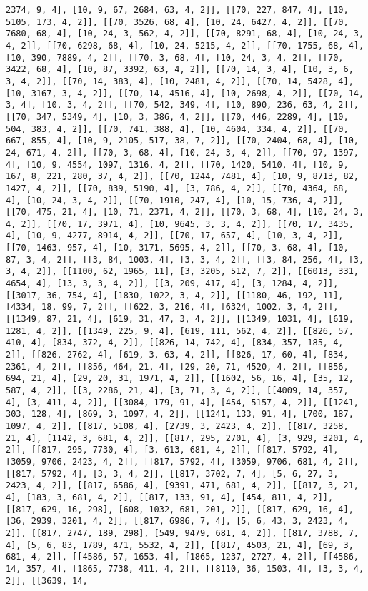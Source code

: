 \documentclass[12pt,fleqn]{article}\usepackage{../../common}
\begin{document}
\begin{verbatim}
2374, 9, 4], [10, 9, 67, 2684, 63, 4, 2]], [[70, 227, 847, 4], [10, 5105, 173, 4, 2]], [[70, 3526, 68, 4], [10, 24, 6427, 4, 2]], [[70, 7680, 68, 4], [10, 24, 3, 562, 4, 2]], [[70, 8291, 68, 4], [10, 24, 3, 4, 2]], [[70, 6298, 68, 4], [10, 24, 5215, 4, 2]], [[70, 1755, 68, 4], [10, 390, 7889, 4, 2]], [[70, 3, 68, 4], [10, 24, 3, 4, 2]], [[70, 3422, 68, 4], [10, 87, 3392, 63, 4, 2]], [[70, 14, 3, 4], [10, 3, 6, 3, 4, 2]], [[70, 14, 383, 4], [10, 2481, 4, 2]], [[70, 14, 5428, 4], [10, 3167, 3, 4, 2]], [[70, 14, 4516, 4], [10, 2698, 4, 2]], [[70, 14, 3, 4], [10, 3, 4, 2]], [[70, 542, 349, 4], [10, 890, 236, 63, 4, 2]], [[70, 347, 5349, 4], [10, 3, 386, 4, 2]], [[70, 446, 2289, 4], [10, 504, 383, 4, 2]], [[70, 741, 388, 4], [10, 4604, 334, 4, 2]], [[70, 667, 855, 4], [10, 9, 2105, 517, 38, 7, 2]], [[70, 2404, 68, 4], [10, 24, 671, 4, 2]], [[70, 3, 68, 4], [10, 24, 3, 4, 2]], [[70, 97, 1397, 4], [10, 9, 4554, 1097, 1316, 4, 2]], [[70, 1420, 5410, 4], [10, 9, 167, 8, 221, 280, 37, 4, 2]], [[70, 1244, 7481, 4], [10, 9, 8713, 82, 1427, 4, 2]], [[70, 839, 5190, 4], [3, 786, 4, 2]], [[70, 4364, 68, 4], [10, 24, 3, 4, 2]], [[70, 1910, 247, 4], [10, 15, 736, 4, 2]], [[70, 475, 21, 4], [10, 71, 2371, 4, 2]], [[70, 3, 68, 4], [10, 24, 3, 4, 2]], [[70, 17, 3971, 4], [10, 9645, 3, 3, 4, 2]], [[70, 17, 3435, 4], [10, 9, 4277, 8914, 4, 2]], [[70, 17, 657, 4], [10, 3, 4, 2]], [[70, 1463, 957, 4], [10, 3171, 5695, 4, 2]], [[70, 3, 68, 4], [10, 87, 3, 4, 2]], [[3, 84, 1003, 4], [3, 3, 4, 2]], [[3, 84, 256, 4], [3, 3, 4, 2]], [[1100, 62, 1965, 11], [3, 3205, 512, 7, 2]], [[6013, 331, 4654, 4], [13, 3, 3, 4, 2]], [[3, 209, 417, 4], [3, 1284, 4, 2]], [[3017, 36, 754, 4], [1830, 1022, 3, 4, 2]], [[1180, 46, 192, 11], [4334, 18, 99, 7, 2]], [[622, 3, 216, 4], [6324, 1002, 3, 4, 2]], [[1349, 87, 21, 4], [619, 31, 47, 3, 4, 2]], [[1349, 1031, 4], [619, 1281, 4, 2]], [[1349, 225, 9, 4], [619, 111, 562, 4, 2]], [[826, 57, 410, 4], [834, 372, 4, 2]], [[826, 14, 742, 4], [834, 357, 185, 4, 2]], [[826, 2762, 4], [619, 3, 63, 4, 2]], [[826, 17, 60, 4], [834, 2361, 4, 2]], [[856, 464, 21, 4], [29, 20, 71, 4520, 4, 2]], [[856, 694, 21, 4], [29, 20, 31, 1971, 4, 2]], [[1602, 56, 16, 4], [35, 12, 587, 4, 2]], [[3, 2286, 21, 4], [3, 71, 3, 4, 2]], [[4009, 14, 357, 4], [3, 411, 4, 2]], [[3084, 179, 91, 4], [454, 5157, 4, 2]], [[1241, 303, 128, 4], [869, 3, 1097, 4, 2]], [[1241, 133, 91, 4], [700, 187, 1097, 4, 2]], [[817, 5108, 4], [2739, 3, 2423, 4, 2]], [[817, 3258, 21, 4], [1142, 3, 681, 4, 2]], [[817, 295, 2701, 4], [3, 929, 3201, 4, 2]], [[817, 295, 7730, 4], [3, 613, 681, 4, 2]], [[817, 5792, 4], [3059, 9706, 2423, 4, 2]], [[817, 5792, 4], [3059, 9706, 681, 4, 2]], [[817, 5792, 4], [3, 3, 4, 2]], [[817, 3702, 7, 4], [5, 6, 27, 3, 2423, 4, 2]], [[817, 6586, 4], [9391, 471, 681, 4, 2]], [[817, 3, 21, 4], [183, 3, 681, 4, 2]], [[817, 133, 91, 4], [454, 811, 4, 2]], [[817, 629, 16, 298], [608, 1032, 681, 201, 2]], [[817, 629, 16, 4], [36, 2939, 3201, 4, 2]], [[817, 6986, 7, 4], [5, 6, 43, 3, 2423, 4, 2]], [[817, 2747, 189, 298], [549, 9479, 681, 4, 2]], [[817, 3788, 7, 4], [5, 6, 83, 1789, 471, 5532, 4, 2]], [[817, 4503, 21, 4], [69, 3, 681, 4, 2]], [[4586, 57, 1653, 4], [1865, 1237, 2727, 4, 2]], [[4586, 14, 357, 4], [1865, 7738, 411, 4, 2]], [[8110, 36, 1503, 4], [3, 3, 4, 2]], [[3639, 14, 
\end{verbatim}
\end{document}

